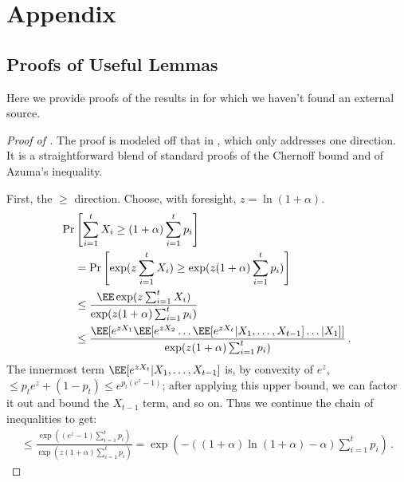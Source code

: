 \appendix
\section{Appendix}\label{sec:appendix}

\subsection{Proofs of Useful Lemmas}\label{subsec:useful-proofs}

Here we provide proofs of the results in  for which we haven't found an external source.

\begin{proof}[Proof of ]
  The proof is modeled off that in \cite{Stoeckl23}, which only addresses
  one direction. It is a straightforward blend of standard proofs of the Chernoff bound and of Azuma's inequality.

  First, the $\ge$ direction. Choose, with foresight, $z = \ln(1 + \alpha)$.
  \begin{align*}
    \Pr&\left[ \sum_{i=1}^{t} X_i \ge (1 + \alpha) \sum_{i =1}^{t} p_i \right] \\
      &= \Pr\left[ \exp( z \sum_{i=1}^{t} X_i) \ge \exp(z (1 + \alpha) \sum_{i =1}^{t} p_i) \right] \\
      &\le \frac{\EE \exp( z \sum_{i=1}^{t} X_i)}{\exp(z (1 + \alpha) \sum_{i =1}^{t} p_i)} \\
      &\le \frac{\EE[e^{z X_1} \EE[e^{z X_2} \ldots \EE[e^{z X_t} | X_1,\ldots,X_{t-1}] \ldots | X_1] ]}{\exp(z (1 + \alpha) \sum_{i =1}^{t} p_i)} \,.
  \end{align*}
  The innermost term $\EE[e^{z X_t} | X_1,\ldots,X_{t-1}]$ is, by convexity of $e^z$, $\le p_t e^z + (1-p_t) \le e^{p_t (e^z - 1)}$; after applying this upper bound, we can factor it out and bound the $X_{t-1}$ term, and so on. Thus we continue the chain of inequalities to get:
  \begin{align*}
    \le \frac{\exp\left((e^z - 1)\sum_{i=1}^{t} p_i\right)}{\exp\left(z (1 + \alpha) \sum_{i =1}^{t} p_i\right)} = \exp\left(- ((1+\alpha) \ln (1+\alpha) - \alpha) \sum_{i =1}^{t} p_i\right) \,.
  \end{align*}
  

\end{proof}

